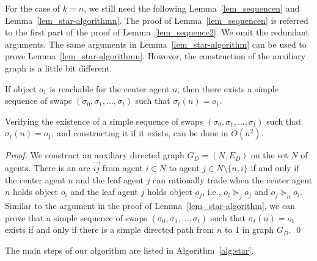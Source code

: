 For the case of $k=n$, we still need the following Lemma~\ref{lem_sequencen} and Lemma~\ref{lem_star-algorithmn}. The proof of Lemma~\ref{lem_sequencen} is referred to the first part of the proof of Lemma~\ref{lem_sequence2}. We omit the redundant arguments.
The same arguments in Lemma~\ref{lem_star-algorithm} can be used to prove Lemma~\ref{lem_star-algorithmn}.
However, the construction of the auxiliary graph is a little bit different.

\begin{lemma}\label{lem_sequencen}
If object $o_1$ is reachable for the center agent $n$, then there exists
a simple sequence of swaps $(\sigma_0,\sigma_1,\dots,\sigma_t)$ such that $\sigma_t(n)=o_1$.
\end{lemma}



    \begin{lemma}\label{lem_star-algorithmn}
        Verifying the existence of a simple sequence of swaps $(\sigma_0,\sigma_1,\dots,\sigma_t)$ such that $\sigma_t(n)=o_1$, and constructing it if it exists, can be done in $O(n^2)$.
    \end{lemma}

\begin{proof}
We construct an auxiliary directed graph $G_D=(N,E_D)$ on the set $N$ of agents.
There is an arc $\overrightarrow{ij}$ from  agent $i\in N$ to agent $j\in N\setminus\{n,i\}$ if and only if
the center agent $n$ and the leaf agent $j$ can rationally trade when the center agent $n$ holds object $o_i$ and the leaf agent $j$ holds object $o_j$,
i.e., $o_i\succeq_j o_j$ and $o_j\succeq_n o_i$.
Similar to the argument in the proof of Lemma~\ref{lem_star-algorithm}, we can prove that
a simple sequence of swaps $(\sigma_0,\sigma_1,\dots,\sigma_t)$ such that $\sigma_t(n)=o_1$ exists if
and only if there is a simple directed path from $n$ to 1 in graph $G_D$.
\qed
\end{proof}

The main steps of our algorithm are listed in Algorithm~\ref{alg:star}.

